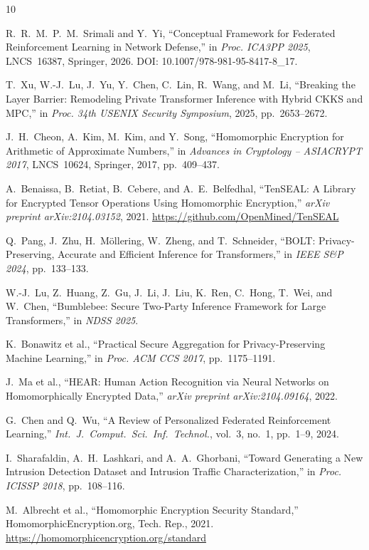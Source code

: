 \documentclass[letterpaper,journal]{IEEEtran}
\begin{document}


\begin{thebibliography}{10}

R.~R.~M.~P.~M.~Srimali and Y.~Yi,
``Conceptual Framework for Federated Reinforcement Learning in Network Defense,''
in \emph{Proc. ICA3PP 2025}, LNCS~16387, Springer, 2026.
DOI: 10.1007/978-981-95-8417-8\_17.

T.~Xu, W.-J.~Lu, J.~Yu, Y.~Chen, C.~Lin, R.~Wang, and M.~Li,
``Breaking the Layer Barrier: Remodeling Private Transformer Inference with
Hybrid CKKS and MPC,''
in \emph{Proc. 34th USENIX Security Symposium}, 2025, pp.~2653--2672.

J.~H.~Cheon, A.~Kim, M.~Kim, and Y.~Song,
``Homomorphic Encryption for Arithmetic of Approximate Numbers,''
in \emph{Advances in Cryptology -- ASIACRYPT 2017}, LNCS~10624,
Springer, 2017, pp.~409--437.

A.~Benaissa, B.~Retiat, B.~Cebere, and A.~E.~Belfedhal,
``TenSEAL: A Library for Encrypted Tensor Operations Using Homomorphic
Encryption,''
\emph{arXiv preprint arXiv:2104.03152}, 2021.
\url{https://github.com/OpenMined/TenSEAL}

Q.~Pang, J.~Zhu, H.~M\"{o}llering, W.~Zheng, and T.~Schneider,
``BOLT: Privacy-Preserving, Accurate and Efficient Inference for
Transformers,''
in \emph{IEEE S\&P 2024}, pp.~133--133.

W.-J.~Lu, Z.~Huang, Z.~Gu, J.~Li, J.~Liu, K.~Ren, C.~Hong, T.~Wei,
and W.~Chen,
``Bumblebee: Secure Two-Party Inference Framework for Large Transformers,''
in \emph{NDSS 2025}.

K.~Bonawitz et al.,
``Practical Secure Aggregation for Privacy-Preserving Machine Learning,''
in \emph{Proc. ACM CCS 2017}, pp.~1175--1191.

J.~Ma et al.,
``HEAR: Human Action Recognition via Neural Networks on Homomorphically
Encrypted Data,''
\emph{arXiv preprint arXiv:2104.09164}, 2022.

G.~Chen and Q.~Wu,
``A Review of Personalized Federated Reinforcement Learning,''
\emph{Int.\ J.\ Comput.\ Sci.\ Inf.\ Technol.}, vol.~3, no.~1,
pp.~1--9, 2024.

I.~Sharafaldin, A.~H.~Lashkari, and A.~A.~Ghorbani,
``Toward Generating a New Intrusion Detection Dataset and Intrusion Traffic
Characterization,''
in \emph{Proc. ICISSP 2018}, pp.~108--116.

M.~Albrecht et al.,
``Homomorphic Encryption Security Standard,''
HomomorphicEncryption.org, Tech. Rep., 2021.
\url{https://homomorphicencryption.org/standard}

\end{thebibliography}
\end{document}
